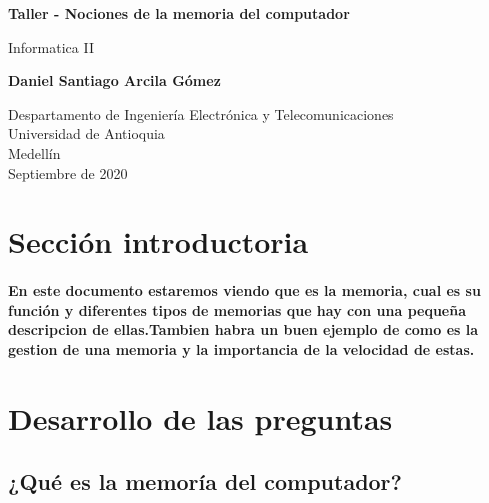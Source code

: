 \documentclass{article}
\begin{document}
\begin{titlepage}
    \begin{center}
        \vspace*{1cm}
            
        \Huge
        \textbf{Taller - Nociones de la memoria del computador}
            
        \vspace{0.5cm}
        \LARGE
        Informatica II
            
        \vspace{1.5cm}
            
        \textbf{Daniel Santiago Arcila Gómez}
            
        \vfill
            
        \vspace{0.8cm}
            
        \Large
        Despartamento de Ingeniería Electrónica y Telecomunicaciones\\
        Universidad de Antioquia\\
        Medellín\\
        Septiembre de 2020
            
    \end{center}
\end{titlepage}

\tableofcontents

\section{Sección introductoria}

\paragraph{En este documento estaremos viendo que es la memoria, cual es su función y diferentes tipos de memorias que hay con una pequeña descripcion de ellas.Tambien habra un buen ejemplo de como es la gestion de una memoria y la importancia de la velocidad de estas.}

\section{Desarrollo de las preguntas} \label{contenido}

\subsection{¿Qué es la memoría del computador?}
\end{document}
